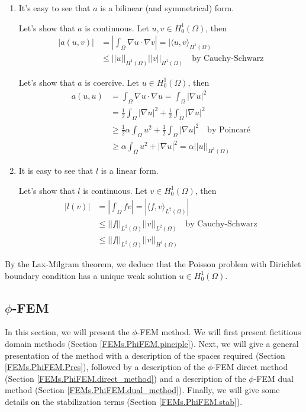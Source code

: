\begin{enumerate}[label=\textbullet]
	\item It's easy to see that $a$ is a bilinear (and symmetrical) form.
	
	Let's show that $a$ is continuous. Let $u,v \in H_0^1(\Omega)$, then
	\begin{align*}
		|a(u,v)|&=\left|\int_\Omega \nabla u\cdot\nabla v\right|=|\langle u,v\rangle_{H^1(\Omega)} \\
		&\le ||u||_{H^1(\Omega)} ||v||_{H^1(\Omega)} \quad\text{by Cauchy-Schwarz}
	\end{align*}
	
	Let's show that $a$ is coercive. Let $u \in H_0^1(\Omega)$, then
	\begin{align*}
		a(u,u)&=\int_\Omega \nabla u\cdot\nabla u=\int_\Omega |\nabla u|^2 \\
		&=\frac{1}{2}\int_\Omega |\nabla u|^2+\frac{1}{2}\int_\Omega |\nabla u|^2 \\
		&\ge\frac{1}{2}\alpha\int_\Omega u^2+\frac{1}{2}\int_\Omega |\nabla u|^2 \quad \text{by Poincaré} \\
		&\ge \alpha\int_\Omega u^2+|\nabla u|^2=\alpha||u||_{H^1(\Omega)}		
	\end{align*}
	\item It is easy to see that $l$ is a linear form.
	
	Let's show that $l$ is continuous. Let $v \in H_0^1(\Omega)$, then
	\begin{align*}
		|l(v)|&=\left|\int_\Omega fv\right|=|\langle f,v\rangle_{L^2(\Omega)}| \\
		&\le ||f||_{L^2(\Omega)} ||v||_{L^2(\Omega)} \quad\text{by Cauchy-Schwarz} \\
		&\le ||f||_{L^2(\Omega)} ||v||_{H^1(\Omega)}
	\end{align*}
\end{enumerate}

By the Lax-Milgram theorem, we deduce that the Poisson problem with Dirichlet boundary condition has a unique weak solution $u\in H_0^1(\Omega)$. 

\subsection{$\phi$-FEM} \label{FEMs.PhiFEM}

In this section, we will present the $\phi$-FEM method. We will first present fictitious domain methods (Section \ref{FEMs.PhiFEM.pinciple}). Next, we will give a general presentation of the method with a description of the spaces required (Section \ref{FEMs.PhiFEM.Pres}), followed by a description of the $\phi$-FEM direct method (Section \ref{FEMs.PhiFEM.direct_method}) and a description of the $\phi$-FEM dual method (Section \ref{FEMs.PhiFEM.dual_method}). Finally, we will give some details on the stabilization terms 
(Section \ref{FEMs.PhiFEM.stab}).

